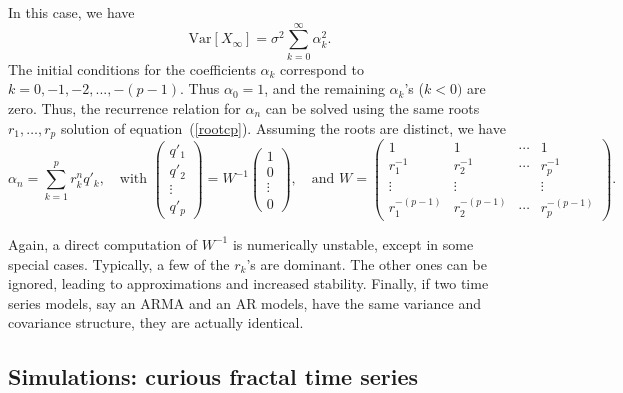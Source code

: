 \documentclass[oneside,10pt]{book}
\begin{document}
In this case, we have
$$
\text{Var}[X_\infty]=\sigma^2\sum_{k=0}^\infty \alpha_k^{2}.
$$
The initial conditions for the coefficients $\alpha_k$ correspond to $k = 0, -1, -2, ..., -(p -1)$. Thus $\alpha_0=1$, and the remaining $\alpha_k$'s ($k<0)$ are zero. Thus, the recurrence relation for $\alpha_n$ can be solved 
using the same roots $r_1,\dots,r_p$ solution of equation~(\ref{rootcp}). Assuming the roots are distinct, we have
\begin{equation}\label{recurr}
\alpha_n = \sum_{k=1}^p r_k^n q'_k, \quad \text{with }
\left(
\begin{aligned}
      q'_1\\
     q'_2 \\
     \vdots \\
    q'_p
\end{aligned}
\right) = W^{-1} \left(
\begin{array}{c}
      1 \\
     0\\
     \vdots \\
    0
\end{array}
\right), 
\quad \text{and }
W=\left(
\begin{array}{cccc}
      1 & 1 & \cdots & 1 \\
     r_1^{-1} & r_2^{-1} & \cdots & r_p^{-1} \\
     \vdots & \vdots &  & \vdots \\
    r_1^{-(p-1)} &  r_2^{-(p-1)} &\cdots  &  r_p^{-(p-1)}
\end{array}
\right).
\end{equation}

\noindent Again, a direct computation of $W^{-1}$ is numerically unstable, except in some special cases. Typically, a few of the $r_k$'s are dominant. The other ones can be ignored, leading to approximations and increased stability. 
Finally, if two time series models, say an ARMA and an AR models, have the same variance and covariance structure, they are actually identical. 

\subsection{Simulations: curious fractal time series}
\end{document}
